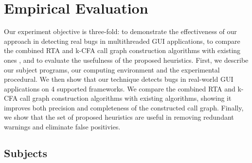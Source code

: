 \section{Empirical Evaluation}
\label{sec:evaluation}

Our experiment objective is three-fold: to demonstrate the effectiveness
of our approach in detecting real bugs in multithreaded GUI applications, to 
compare the combined RTA and k-CFA call graph construction algorithms
with existing ones , and to evaluate the usefulness of the proposed 
 heuristics. First, we describe our subject programs, our computing
environment and the experimental procedural. We then show that our technique
detects bugs in real-world GUI applications on
4 supported frameworks. We compare the combined RTA and k-CFA call graph
construction algorithms with existing algorithms, showing it improves
both precision and completeness of the constructed call graph.
 Finally, we show that the set of proposed heuristics are useful
in removing redundant warnings and eliminate false positivies. 



\subsection{Subjects}

